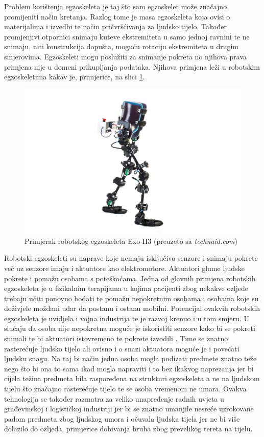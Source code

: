 \documentclass[times, utf8, diplomski]{fer}
\begin{document}
Problem korištenja egzoskeleta je taj što sam egzoskelet može značajno promijeniti način kretanja. Razlog tome je masa egzoskeleta
koja ovisi o materijalima i izvedbi te način pričvršćivanja za ljudsko tijelo. Također promjenjivi otpornici snimaju kuteve 
ekstremiteta u samo jednoj ravnini te ne snimaju, niti konstrukcija dopušta, moguću rotaciju ekstremiteta u drugim smjerovima.
Egzoskeleti mogu poslužiti za snimanje pokreta no njihova prava primjena nije u domeni prikupljanja podataka. Njihova primjena 
leži u robotskim egzoskeletima kakav je, primjerice, na slici \ref{exoskeleton}.

\begin{figure}
    \includegraphics[width=\textwidth]{exoskeleton.jpg}
    \caption{Primjerak robotskog egzoskeleta Exo-H3 (preuzeto sa \textit{technaid.com})}
    \label{exoskeleton}
\end{figure}

Robotski egzoskeleti su naprave koje nemaju isključivo senzore i snimaju pokrete već uz senzore imaju i aktuatore kao elektromotore.
Aktuatori glume ljudske pokrete i pomažu osobama s poteškoćama. Jedna od glavnih primjena robotskih egzoskeleta je u fizikalnim
terapijama u kojima pacijenti zbog nekakve ozljede trebaju učiti ponovno hodati te pomažu nepokretnim osobama i osobama koje su
doživjele moždani udar da postanu i ostanu mobilni. Potencijal ovakvih robotskih egzoskeleta je uvidjela i vojna industrija te
je razvoj krenuo i u tom smjeru. U slučaju da osoba nije nepokretna moguće je iskoristiti senzore kako bi se pokreti snimali te
bi aktuatori istovremeno te pokrete izvodili \citep{exo}. Time se znatno rasterećuje ljudsko tijelo ali ovisno i o snazi aktuatora moguće je i
povećati ljudsku snagu. Na taj bi način jedna osoba mogla podizati predmete znatno teže nego što bi ona to sama ikad mogla
napraviti i to bez ikakvog naprezanja jer bi cijela težina predmeta bila raspoređena na strukturi egzoskeleta a ne na ljudskom 
tijelu što značajno rasterećuje tijelo te se osoba vremenom ne umara. Ovakva tehnologija se također razmatra za veliko unapređenje
radnih uvjeta u građevinskoj i logističkoj industriji jer bi se znatno umanjile nesreće uzrokovane padom predmeta zbog ljudskog
umora i očuvala ljudska tijela jer ne bi više dolazilo do ozljeda, primjerice dobivanja bruha zbog prevelikog tereta na tijelu.
\end{document}
